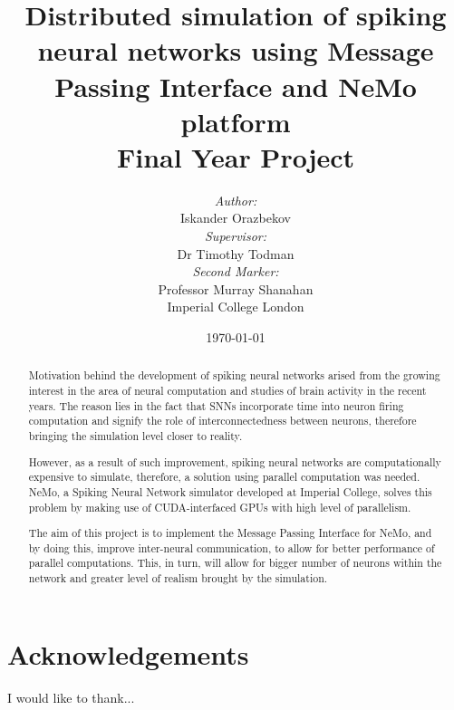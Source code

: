 \documentclass[12pt]{report}
\title{\LARGE Distributed simulation of spiking neural networks using Message Passing Interface and NeMo platform \\ \vspace{7mm} \large Final Year Project}
\author{ \emph{Author:} \\ Iskander Orazbekov \vspace{5 mm} \\ \emph{Supervisor:} \\ Dr Timothy Todman \vspace{5 mm} \\ \emph{Second Marker:} \\ Professor Murray Shanahan \vspace{56 mm} \\ Imperial College London}
\date{\today}
\begin{document}
\maketitle

\begin{abstract}

Motivation behind the development of spiking neural networks arised from the growing interest in the area of neural 
computation and studies of brain activity in the recent years. The reason lies in the fact that SNNs incorporate time
into neuron firing computation and signify the role of interconnectedness between neurons, therefore bringing the simulation 
level closer to reality.

However, as a result of such improvement, spiking neural networks are computationally expensive to simulate, therefore, a solution 
using parallel computation was needed. NeMo, a Spiking Neural Network simulator developed at Imperial College, solves this problem 
by making use of CUDA-interfaced GPUs with high level of parallelism.

The aim of this project is to implement the Message Passing Interface for NeMo, and by doing this, improve inter-neural communication, 
to allow for better performance of parallel computations. This, in turn, will allow for bigger number of neurons within the network 
and greater level of realism brought by the simulation.

\end{abstract}

\clearpage

\chapter*{Acknowledgements}
\thispagestyle{empty}

I would like to thank...

\clearpage

\tableofcontents

\renewcommand{\chaptername}{}















\clearpage



\end{document}
